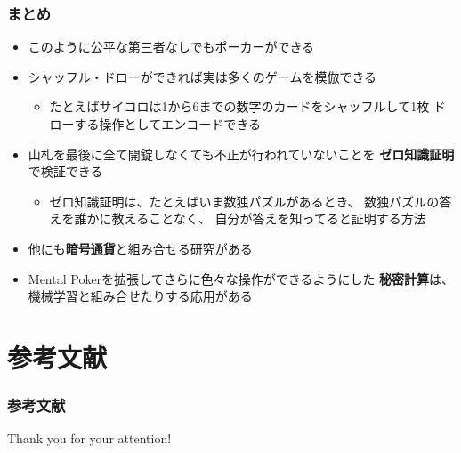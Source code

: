 \begin{frame}
  \frametitle{まとめ}

  \pause
  \begin{itemize}
    \item<+-> このように公平な第三者なしでもポーカーができる
    \item<+-> シャッフル・ドローができれば実は多くのゲームを模倣できる
    \begin{itemize}
      \item たとえばサイコロは1から6までの数字のカードをシャッフルして1枚
      ドローする操作としてエンコードできる
    \end{itemize}

    \item<+-> 山札を最後に全て開錠しなくても不正が行われていないことを
    \textbf{ゼロ知識証明}で検証できる\cite{cmp}
    \begin{itemize}
      \item ゼロ知識証明は、たとえばいま数独パズルがあるとき、
      数独パズルの答えを誰かに教えることなく、
      自分が答えを知ってると証明する方法
    \end{itemize}

    \item<+-> 他にも\textbf{暗号通貨}と組み合せる研究\cite{Kumaresan}がある

    \item<+-> Mental Pokerを拡張してさらに色々な操作ができるようにした
    \textbf{秘密計算}は、機械学習と組み合せたりする応用\cite{ntt}がある
  \end{itemize}
\end{frame}

\section*{参考文献}

\begin{frame}
  \frametitle{参考文献}

  
  
\end{frame}

\begin{frame}
  \centering
  {\Huge Thank you for your attention!}
\end{frame}


